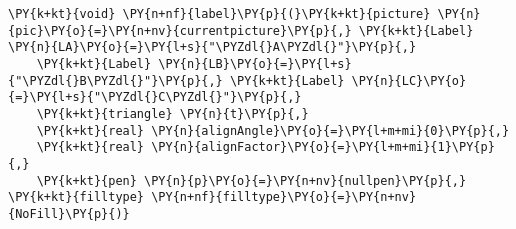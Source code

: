 \begin{Verbatim}[commandchars=\\\{\}]
    \PY{k+kt}{void} \PY{n+nf}{label}\PY{p}{(}\PY{k+kt}{picture} \PY{n}{pic}\PY{o}{=}\PY{n+nv}{currentpicture}\PY{p}{,} \PY{k+kt}{Label} \PY{n}{LA}\PY{o}{=}\PY{l+s}{"\PYZdl{}A\PYZdl{}"}\PY{p}{,}
    \PY{k+kt}{Label} \PY{n}{LB}\PY{o}{=}\PY{l+s}{"\PYZdl{}B\PYZdl{}"}\PY{p}{,} \PY{k+kt}{Label} \PY{n}{LC}\PY{o}{=}\PY{l+s}{"\PYZdl{}C\PYZdl{}"}\PY{p}{,}
    \PY{k+kt}{triangle} \PY{n}{t}\PY{p}{,}
    \PY{k+kt}{real} \PY{n}{alignAngle}\PY{o}{=}\PY{l+m+mi}{0}\PY{p}{,}
    \PY{k+kt}{real} \PY{n}{alignFactor}\PY{o}{=}\PY{l+m+mi}{1}\PY{p}{,}
    \PY{k+kt}{pen} \PY{n}{p}\PY{o}{=}\PY{n+nv}{nullpen}\PY{p}{,} \PY{k+kt}{filltype} \PY{n+nf}{filltype}\PY{o}{=}\PY{n+nv}{NoFill}\PY{p}{)}
\end{Verbatim}
